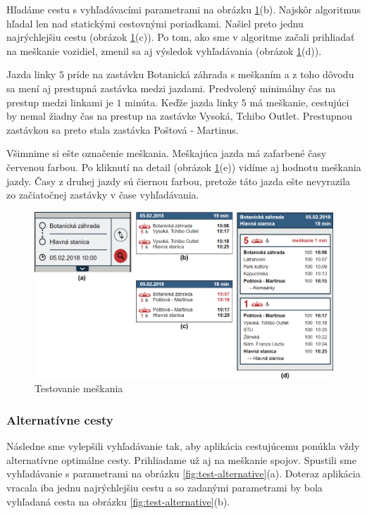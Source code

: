 Hľadáme cestu s vyhľadávacími parametrami na obrázku \ref{fig:test-delay}(b). Najskôr algoritmus hľadal len nad statickými cestovnými poriadkami. Našiel preto jednu najrýchlejšiu cestu (obrázok \ref{fig:test-delay}(c)). 
Po tom, ako sme v algoritme začali prihliadať na meškanie vozidiel, zmenil sa aj výsledok vyhľadávania (obrázok \ref{fig:test-delay}(d)). 

Jazda linky $5$ príde na zastávku Botanická záhrada s meškaním a z toho dôvodu sa mení aj prestupná zastávka medzi jazdami. Predvolený minimálny čas na prestup medzi linkami je $1$ minúta. Keďže jazda linky $5$ má meškanie, cestujúci by nemal žiadny čas na prestup na zastávke Vysoká, Tchibo Outlet. Prestupnou zastávkou sa preto stala zastávka Poštová - Martinus.

Všimnime si ešte označenie meškania. Meškajúca jazda má zafarbené časy červenou farbou. Po kliknutí na detail (obrázok \ref{fig:test-delay}(e)) vidíme aj hodnotu meškania jazdy. Časy z druhej jazdy sú čiernou farbou, pretože táto jazda ešte nevyrazila zo začiatočnej zastávky v čase vyhľadávania. 

\begin{figure}[H]
\centerline{\includegraphics[width=1.0\textwidth]{images/test/delay}}
\caption[Testovanie meškania]{Testovanie meškania}
\label{fig:test-delay}
\end{figure}

\subsubsection{Alternatívne cesty}
Následne sme vylepšili vyhľadávanie tak, aby aplikácia cestujúcemu ponúkla vždy alternatívne optimálne cesty. Prihliadame už aj na meškanie spojov. Spustili sme vyhľadávanie s parametrami na obrázku \ref{fig:test-alternative}(a). Doteraz aplikácia vracala iba jednu najrýchlejšiu cestu a so zadanými parametrami by bola vyhľadaná cesta na obrázku \ref{fig:test-alternative}(b).

